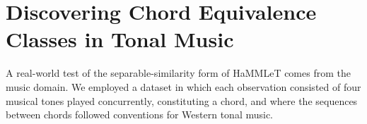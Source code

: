 \section{Discovering Chord Equivalence Classes in Tonal Music}
\label{sec:disc-chord-equiv}

A real-world test of the separable-similarity form of HaMMLeT comes from the music domain.  We employed a dataset in which each observation consisted of four musical tones played concurrently, constituting a chord, and where the sequences between chords followed conventions for Western tonal music. 